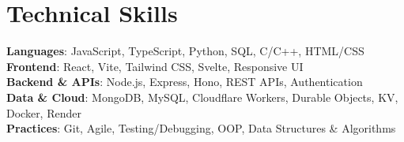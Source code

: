 \documentclass[letterpaper,11pt]{article}
\begin{document}
\section{Technical Skills}
\begin{itemize}[leftmargin=0.15in, label={}]
\small{\item{
\textbf{Languages}{: JavaScript, TypeScript, Python, SQL, C/C++, HTML/CSS} \\
\textbf{Frontend}{: React, Vite, Tailwind CSS, Svelte, Responsive UI} \\
\textbf{Backend \& APIs}{: Node.js, Express, Hono, REST APIs, Authentication} \\
\textbf{Data \& Cloud}{: MongoDB, MySQL, Cloudflare Workers, Durable Objects, KV, Docker, Render} \\
\textbf{Practices}{: Git, Agile, Testing/Debugging, OOP, Data Structures \& Algorithms}
}}
\end{itemize}

\end{document}
